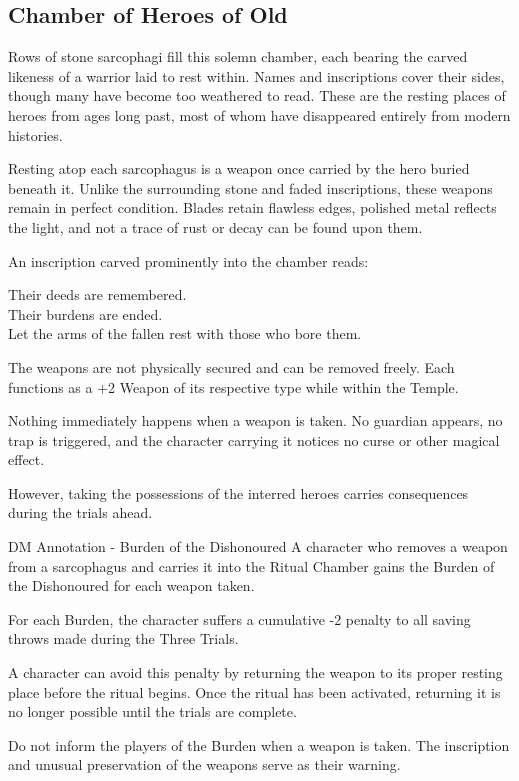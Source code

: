 \subsection*{ Chamber of Heroes of Old}
{\entryfont Rows of stone sarcophagi fill this solemn chamber, each bearing the carved likeness of a warrior laid to rest within. Names and inscriptions cover their sides, though many have become too weathered to read. These are the resting places of heroes from ages long past, most of whom have disappeared entirely from modern histories.

Resting atop each sarcophagus is a weapon once carried by the hero buried beneath it. Unlike the surrounding stone and faded inscriptions, these weapons remain in perfect condition. Blades retain flawless edges, polished metal reflects the light, and not a trace of rust or decay can be found upon them.

An inscription carved prominently into the chamber reads:}
\begin{DndReadAloud}
	Their deeds are remembered.\\
	Their burdens are ended.\\
	Let the arms of the fallen rest with those who bore them.
\end{DndReadAloud}
{\noindent\entryfont The weapons are not physically secured and can be removed freely. Each functions as a +2 Weapon of its respective type while within the Temple.

Nothing immediately happens when a weapon is taken. No guardian appears, no trap is triggered, and the character carrying it notices no curse or other magical effect.

However, taking the possessions of the interred heroes carries consequences during the trials ahead.}

\begingroup
	\DndSetThemeColor[PhbTan]
	\begin{DndComment}{DM Annotation - Burden of the Dishonoured}
		A character who removes a weapon from a sarcophagus and carries it into the Ritual Chamber gains the Burden of the Dishonoured for each weapon taken.

For each Burden, the character suffers a cumulative -2 penalty to all saving throws made during the Three Trials.

A character can avoid this penalty by returning the weapon to its proper resting place before the ritual begins. Once the ritual has been activated, returning it is no longer possible until the trials are complete.

Do not inform the players of the Burden when a weapon is taken. The inscription and unusual preservation of the weapons serve as their warning.
	\end{DndComment}
\endgroup


